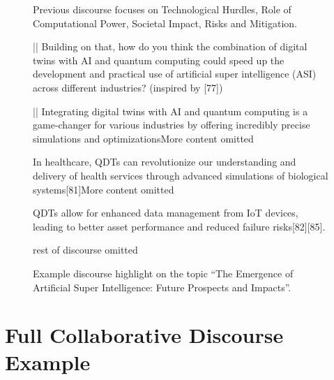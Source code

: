 \documentclass[11pt]{article}
\begin{document}
\begin{figure}

\begin{showcase}[title=Topic: The Emergence of Artificial Super Intelligence: Future Prospects and Impacts]

{Previous discourse focuses on Technological Hurdles, Role of Computational Power, Societal Impact, Risks and Mitigation.}

||
Building on that, how do you think the combination of digital twins with AI and quantum computing could speed up the development and practical use of artificial super intelligence (ASI) across different industries? (inspired by [77])

||
Integrating digital twins with AI and quantum computing is a game-changer for various industries by offering incredibly precise simulations and optimizations{More content omitted}

In healthcare, QDTs can revolutionize our understanding and delivery of health services through advanced simulations of biological systems[81]{More content omitted}

QDTs allow for enhanced data management from IoT devices, leading to better asset performance and reduced failure risks[82][85].

{rest of discourse omitted}

\end{showcase}

\caption{Example discourse highlight on the topic ``The Emergence of Artificial Super Intelligence: Future Prospects and Impacts''.}
    \label{showcase:showcase2}
\end{figure}

% 

\newpage
\onecolumn

\section{Full Collaborative Discourse Example}
\label{sec:alphafold_discourse}
\end{document}
